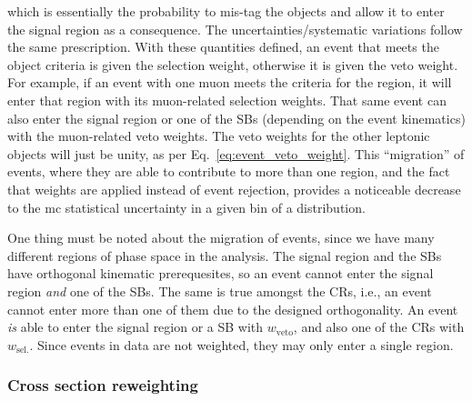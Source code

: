which is essentially the probability to mis-tag the objects and allow it to enter the signal region as a consequence. The uncertainties/systematic variations follow the same prescription. With these quantities defined, an event that meets the object criteria is given the selection weight, otherwise it is given the veto weight. For example, if an event with one muon meets the criteria for the \singleMuCr region, it will enter that region with its muon-related selection weights. That same event can also enter the signal region or one of the \glspl{SB} (depending on the event kinematics) with the muon-related veto weights. The veto weights for the other leptonic objects will just be unity, as per Eq.~\ref{eq:event_veto_weight}. This ``migration'' of events, where they are able to contribute to more than one region, and the fact that weights are applied instead of event rejection, provides a noticeable decrease to the \acrlong{mc} statistical uncertainty in a given bin of a distribution.

One thing must be noted about the migration of events, since we have many different regions of phase space in the analysis. The signal region and the \glspl{SB} have orthogonal kinematic prerequesites, so an event cannot enter the signal region \emph{and} one of the \glspl{SB}. The same is true amongst the \glspl{CR}, i.e., an event cannot enter more than one of them due to the designed orthogonality. An event \emph{is} able to enter the signal region or a \gls{SB} with $w_{\mathrm{veto}}$, and also one of the \glspl{CR} with $w_{\mathrm{sel.}}$. Since events in data are not weighted, they may only enter a single region.





\subsubsection{Cross section reweighting}
\label{subsubsec:xs_weighting}

